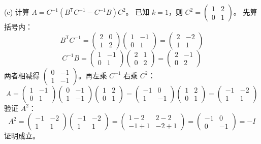 \begin{questions}
\begin{solution}
(c) 计算 $A = C^{-1}(B^{\mathsf{T}} C^{-1} - C^{-1} B) C^2$。
已知 $k=1$，则 $C^2 = \begin{pmatrix} 1 & 2 \\ 0 & 1 \end{pmatrix}$。
先算括号内：
\[
B^{\mathsf{T}} C^{-1} = \begin{pmatrix} 2 & 0 \\ 1 & 2 \end{pmatrix} \begin{pmatrix} 1 & -1 \\ 0 & 1 \end{pmatrix} = \begin{pmatrix} 2 & -2 \\ 1 & 1 \end{pmatrix}
\]
\[
C^{-1} B = \begin{pmatrix} 1 & -1 \\ 0 & 1 \end{pmatrix} \begin{pmatrix} 2 & 1 \\ 0 & 2 \end{pmatrix} = \begin{pmatrix} 2 & -1 \\ 0 & 2 \end{pmatrix}
\]
两者相减得 $\begin{pmatrix} 0 & -1 \\ 1 & -1 \end{pmatrix}$。再左乘 $C^{-1}$ 右乘 $C^2$：
\[
A = \begin{pmatrix} 1 & -1 \\ 0 & 1 \end{pmatrix} \begin{pmatrix} 0 & -1 \\ 1 & -1 \end{pmatrix} \begin{pmatrix} 1 & 2 \\ 0 & 1 \end{pmatrix} = \begin{pmatrix} -1 & 0 \\ 1 & -1 \end{pmatrix} \begin{pmatrix} 1 & 2 \\ 0 & 1 \end{pmatrix} = \begin{pmatrix} -1 & -2 \\ 1 & 1 \end{pmatrix}
\]
验证 $A^2$：
\[
A^2 = \begin{pmatrix} -1 & -2 \\ 1 & 1 \end{pmatrix} \begin{pmatrix} -1 & -2 \\ 1 & 1 \end{pmatrix} = \begin{pmatrix} 1-2 & 2-2 \\ -1+1 & -2+1 \end{pmatrix} = \begin{pmatrix} -1 & 0 \\ 0 & -1 \end{pmatrix} = -I
\]
证明成立。


\end{solution}
\end{questions}
